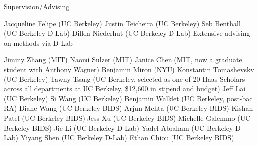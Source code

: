 \begin{rubric}{Supervision/Advising}

\entry* Jacqueline Felipe (UC Berkeley)
\entry* Justin Teicheira (UC Berkeley)
\entry* Seb Benthall (UC Berkeley D-Lab)
\entry* Dillon Niederhut (UC Berkeley D-Lab)
\entry* Extensive advising on methods via D-Lab

\entry* Jimmy Zhang (MIT)
\entry* Naomi Sulzer (MIT)
\entry* Janice Chen (MIT, now a graduate student with Anthony Wagner)
\entry* Benjamin Miron (NYU)
\entry* Konstantin Tomashevsky (UC Berkeley)
\entry* \hangindent=0.7cm Tawny Tsang (UC Berkeley, selected as one of 20 Haas
Scholars across all departments at UC Berkeley, \$12,600 in stipend and budget)
\entry* Jeff Lai (UC Berkeley)
\entry* Si Wang (UC Berkeley)
\entry* Benjamin Walklet (UC Berkeley, post-bac RA)
\entry* Diane Wang (UC Berkeley BIDS)
\entry* Arjun Mehta (UC Berkeley BIDS)
\entry* Kishan Patel (UC Berkeley BIDS)
\entry* Jess Xu (UC Berkeley BIDS)
\entry* Michelle Galemmo (UC Berkeley BIDS)
\entry* Jie Li (UC Berkeley D-Lab)
\entry* Yadel Abraham (UC Berkeley D-Lab)
\entry* Yiyang Shen (UC Berkeley D-Lab)
\entry* Ethan Chiou (UC Berkeley BIDS)

\end{rubric}
